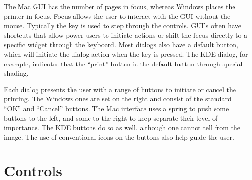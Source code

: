 
The Mac GUI has the number of pages in focus, whereas Windows places
the printer in focus. Focus allows the user to interact with the GUI
without the mouse. Typically the  key is used to step through
the controls. GUI's often have shortcuts that allow power users to
initiate actions or shift the focus directly to a specific widget
through the keyboard.  Most dialogs also have a default button, which
will initiate the dialog action when the  key is
pressed. The KDE dialog, for example, indicates that the ``print''
button is the default button through special shading.




Each dialog presents the user with a range of buttons to initiate or
cancel the printing. The Windows ones are set on the right and consist
of the standard ``OK'' and ``Cancel'' buttons. The Mac interface uses
a spring to push some buttons to the left, and some to the right to
keep separate their level of importance. The KDE buttons do so as
well, although one cannot tell from the image. The use
of conventional icons on the buttons also help guide the user. 


\section{Controls}
\label{sec:GUI:basic-components}

